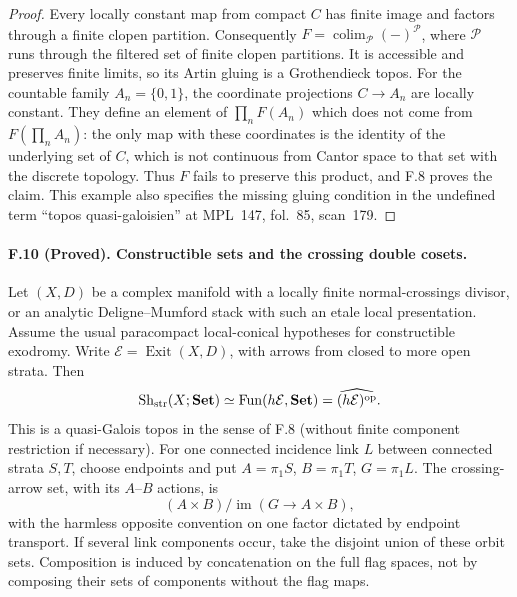 \begin{proof}
Every locally constant map from compact $C$ has finite image and factors
through a finite clopen partition. Consequently
$F=\operatorname*{colim}_{\mathcal P}(-)^{\mathcal P}$, where
$\mathcal P$ runs through the filtered set of finite clopen partitions.
It is accessible and preserves finite limits, so its Artin gluing is a
Grothendieck topos. For the countable family $A_n=\{0,1\}$, the coordinate
projections $C\to A_n$ are locally constant. They define an element of
$\prod_nF(A_n)$ which does not come from $F(\prod_n A_n)$: the only map
with these coordinates is the identity of the underlying set of $C$,
which is not continuous from Cantor space to that set with the discrete
topology. Thus $F$ fails to preserve this product, and F.8 proves the
claim. This example also specifies the missing gluing condition in the
undefined term ``topos quasi-galoisien'' at MPL~147, fol.~85, scan~179.
\end{proof}

\paragraph{F.10 (Proved). Constructible sets and the crossing double cosets.}
Let $(X,D)$ be a complex manifold with a locally finite normal-crossings
divisor, or an analytic Deligne--Mumford stack with such an etale local
presentation. Assume the usual paracompact local-conical hypotheses for
constructible exodromy. Write $\mathcal E=\operatorname{Exit}(X,D)$,
with arrows from closed to more open strata. Then
\[
 \operatorname{Sh}_{\rm str}(X;\mathbf{Set})
       \simeq\operatorname{Fun}(h\mathcal E,\mathbf{Set})
       =\widehat{(h\mathcal E)^{\rm op}}.
\]
This is a quasi-Galois topos in the sense of F.8 (without finite component
restriction if necessary). For one connected incidence link $L$ between
connected strata $S,T$, choose endpoints and put
$A=\pi_1S$, $B=\pi_1T$, $G=\pi_1L$. The crossing-arrow set, with its
$A$--$B$ actions, is
\[
             (A\times B)/\operatorname{im}(G\to A\times B),
\]
with the harmless opposite convention on one factor dictated by endpoint
transport. If several link components occur, take the disjoint union of
these orbit sets. Composition is induced by concatenation on the full
flag spaces, not by composing their sets of components without the flag
maps.

